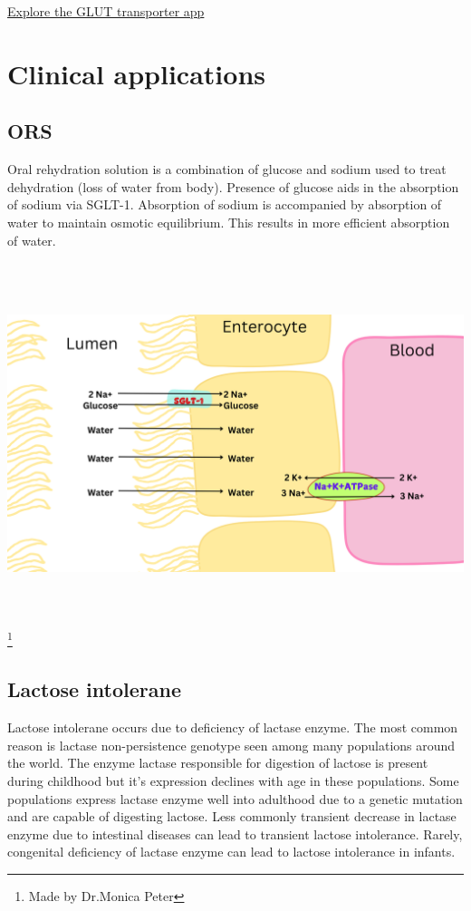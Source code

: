 \documentclass[
]{book}
\begin{document}
\href{padmanaban55.github.io/GLUT_Transporters/}{Explore the GLUT transporter app}

\section{Clinical applications}\label{clinical-applications}

\subsection{ORS}\label{ors}

Oral rehydration solution is a combination of glucose and sodium used to treat dehydration (loss of water from body). Presence of glucose aids in the absorption of sodium via SGLT-1. Absorption of sodium is accompanied by absorption of water to maintain osmotic equilibrium. This results in more efficient absorption of water.

\includegraphics[width=\textwidth,height=4.16667in]{Images/ORS.png}
\footnote{Made by Dr.Monica Peter}

\subsection{Lactose intolerane}\label{lactose-intolerane}

Lactose intolerane occurs due to deficiency of lactase enzyme. The most common reason is lactase non-persistence genotype seen among many populations around the world. The enzyme lactase responsible for digestion of lactose is present during childhood but it's expression declines with age in these populations. Some populations express lactase enzyme well into adulthood due to a genetic mutation and are capable of digesting lactose. Less commonly transient decrease in lactase enzyme due to intestinal diseases can lead to transient lactose intolerance. Rarely, congenital deficiency of lactase enzyme can lead to lactose intolerance in infants.
\end{document}
